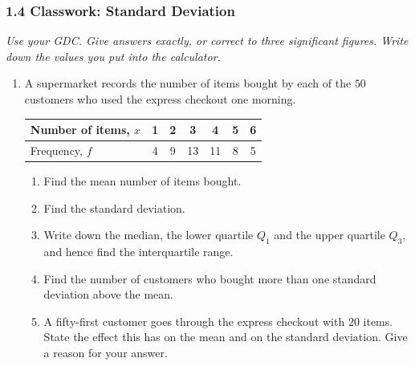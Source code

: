 \documentclass[12pt, twoside]{article}
\begin{document}
\subsubsection*{1.4 Classwork: Standard Deviation}

\emph{Use your GDC. Give answers exactly, or correct to three significant
figures. Write down the values you put into the calculator.}

\begin{enumerate}[itemsep=0.15cm]

\item[1.]

A supermarket records the number of items bought by each of the $50$
customers who used the express checkout one morning.

\begin{center}
\setlength{\tabcolsep}{10pt}\renewcommand{\arraystretch}{1.2}
\begin{tabular}{|l|c|c|c|c|c|c|}
\hline
Number of items, $x$ & 1 & 2 & 3 & 4 & 5 & 6 \\
\hline
Frequency, $f$ & 4 & 9 & 13 & 11 & 8 & 5 \\
\hline
\end{tabular}
\end{center}

\begin{enumerate}[itemsep=0.1cm]
  \item Find the mean number of items bought.
  \item Find the standard deviation.
  \item Write down the median, the lower quartile $Q_{1}$ and the upper
  quartile $Q_{3}$, and hence find the interquartile range.
  \item Find the number of customers who bought more than one standard
  deviation above the mean.
  \item A fifty-first customer goes through the express checkout with $20$
  items. State the effect this has on the mean and on the standard
  deviation. Give a reason for your answer.
\end{enumerate}



\end{enumerate}
\end{document}
